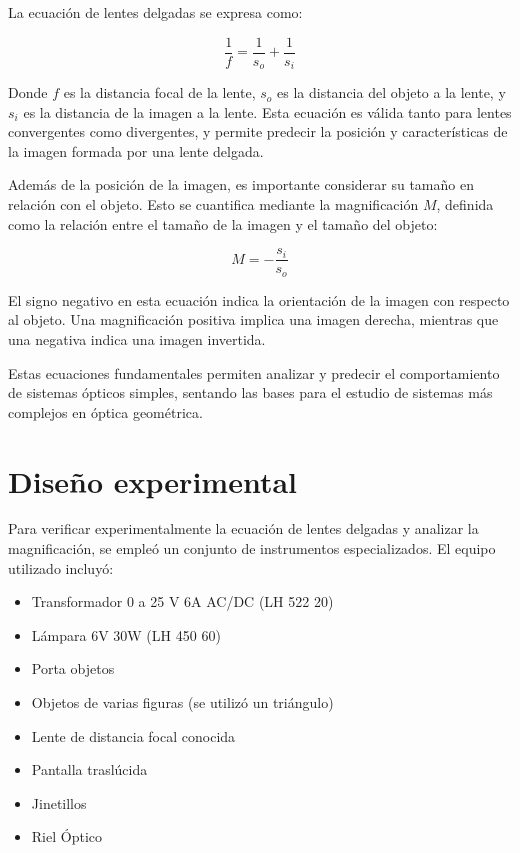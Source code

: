 \documentclass[twocolumn,a4paper,11pt]{scrartcl}
\begin{document}
La ecuación de lentes delgadas se expresa como:

\begin{equation}
\frac{1}{f} = \frac{1}{s_o} + \frac{1}{s_i}
\end{equation}

Donde $f$ es la distancia focal de la lente, $s_o$ es la distancia del objeto a la lente, y $s_i$ es la distancia de la imagen a la lente. Esta ecuación es válida tanto para lentes convergentes como divergentes, y permite predecir la posición y características de la imagen formada por una lente delgada.

Además de la posición de la imagen, es importante considerar su tamaño en relación con el objeto. Esto se cuantifica mediante la magnificación $M$, definida como la relación entre el tamaño de la imagen y el tamaño del objeto:

\begin{equation}
M = -\frac{s_i}{s_o}
\end{equation}

El signo negativo en esta ecuación indica la orientación de la imagen con respecto al objeto. Una magnificación positiva implica una imagen derecha, mientras que una negativa indica una imagen invertida.

Estas ecuaciones fundamentales permiten analizar y predecir el comportamiento de sistemas ópticos simples, sentando las bases para el estudio de sistemas más complejos en óptica geométrica.

\section{Diseño experimental}
Para verificar experimentalmente la ecuación de lentes delgadas y analizar la magnificación, se empleó un conjunto de instrumentos especializados. El equipo utilizado incluyó:

\begin{itemize}
    \item Transformador 0 a 25 V 6A AC/DC (LH 522 20)
    \item Lámpara 6V 30W (LH 450 60)
    \item Porta objetos
    \item Objetos de varias figuras (se utilizó un triángulo)
    \item Lente de distancia focal conocida
    \item Pantalla traslúcida
    \item Jinetillos
    \item Riel Óptico
\end{itemize}
\end{document}
